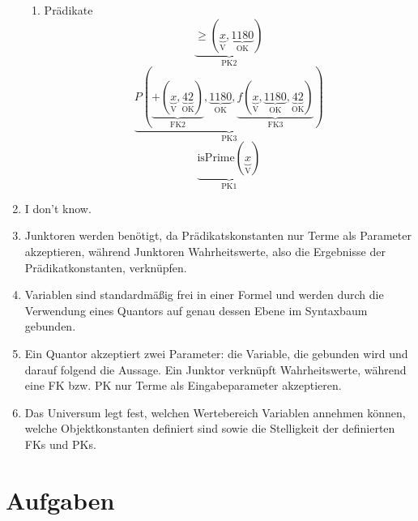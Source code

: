 \documentclass[a4paper]{article}
\begin{document}
\begin{enumerate}
\begin{enumerate}
			\item Prädikate
			\begin{equation*}
				\underbrace{\geq(\underbrace{x}_{\text{V}}, \underbrace{1180}_{\text{OK}})}_{\text{PK2}}
			\end{equation*}
			\begin{equation*}
				\underbrace{P(\underbrace{+(\underbrace{x}_{\text{V}}, \underbrace{42}_{\text{OK}})}_{\text{FK2}}, \underbrace{1180}_{\text{OK}}, \underbrace{f(\underbrace{x}_{\text{V}}, \underbrace{1180}_{\text{OK}}, \underbrace{42}_{\text{OK}})}_{\text{FK3}})}_{\text{PK3}}
			\end{equation*}
			\begin{equation*}
				\underbrace{\text{isPrime}(\underbrace{x}_{\text{V}})}_{\text{PK1}}
			\end{equation*}
		\end{enumerate}
		
		\item
		I don't know.
		
		\item
		Junktoren werden benötigt, da Prädikatskonstanten nur Terme als Parameter akzeptieren, während Junktoren Wahrheitswerte, also die Ergebnisse der Prädikatkonstanten, verknüpfen.
		
		\item
		Variablen sind standardmäßig frei in einer Formel und werden durch die Verwendung eines Quantors auf genau dessen Ebene im Syntaxbaum gebunden.
		
		\item
		Ein Quantor akzeptiert zwei Parameter: die Variable, die gebunden wird und darauf folgend die Aussage. Ein Junktor verknüpft Wahrheitswerte, während eine FK bzw. PK nur Terme als Eingabeparameter akzeptieren.
		
		\item
		Das Universum legt fest, welchen Wertebereich Variablen annehmen können, welche Objektkonstanten definiert sind sowie die Stelligkeit der definierten FKs und PKs.
	\end{enumerate}
	
	\section{Aufgaben}
	
\end{document}
